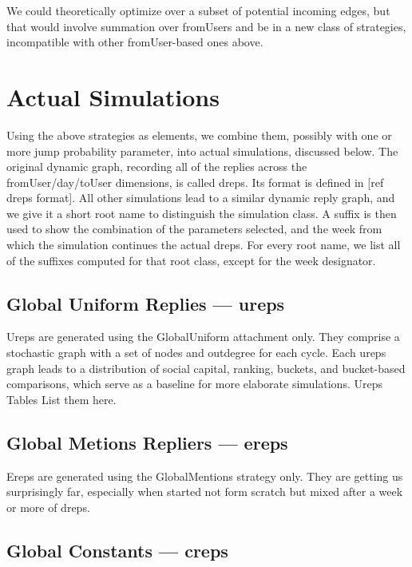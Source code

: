 \documentclass[10pt,oneside]{memoir}
\begin{document}
We could theoretically optimize over a subset of potential incoming edges, but that would involve summation over fromUsers and be in a new class of strategies, incompatible with other fromUser-based ones above.


\section{Actual Simulations}
\label{actualsimulations}

Using the above strategies as elements, we combine them, possibly with one or more jump probability parameter, into actual simulations, discussed below.  The original dynamic graph, recording all of the replies across the fromUser/day/toUser dimensions, is called dreps.  Its format is defined in [ref dreps format].  All other simulations lead to a similar dynamic reply graph, and we give it a short root name to distinguish the simulation class.  A suffix is then used to show the combination of the parameters selected, and the week from which the simulation continues the actual dreps.  For every root name, we list all of the suffixes computed for that root class, except for the week designator.


\subsection{Global Uniform Replies --- ureps}
\label{globaluniformrepliesureps}

Ureps are generated using the GlobalUniform attachment only.  They comprise a stochastic graph with a set of nodes and outdegree for each cycle.  Each ureps graph leads to a distribution of social capital, ranking, buckets, and bucket-based comparisons, which serve as a baseline for more elaborate simulations.
Ureps Tables
List them here.


\subsection{Global Metions Repliers --- ereps}
\label{globalmetionsrepliersereps}

Ereps are generated using the GlobalMentions strategy only.  They are getting us surprisingly far, especially when started not form scratch but mixed after a week or more of dreps.


\subsection{Global Constants --- creps}
\label{globalconstantscreps}
\end{document}

